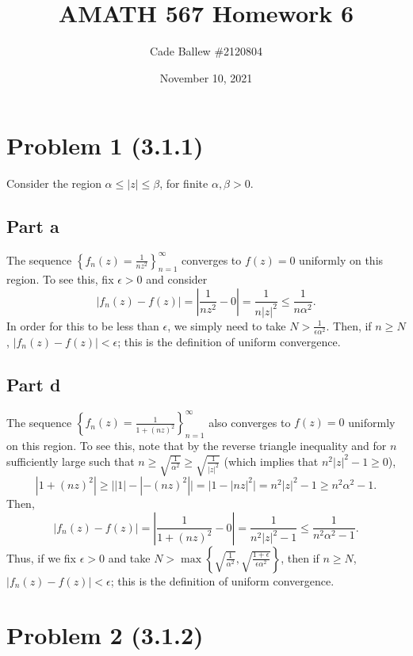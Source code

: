 \documentclass{article}
\title{AMATH 567 Homework 6}
\author{Cade Ballew \#2120804}
\date{November 10, 2021}
\begin{document}
\maketitle

\section{Problem 1 (3.1.1)}
Consider the region $\alpha \leq |z| \leq \beta$, for finite $\alpha, \beta > 0$.
\subsection{Part a}
The sequence $\left\{f_n(z)=\frac{1}{nz^2}\right\}_{n=1}^{\infty}$ converges to $f(z)=0$ uniformly on this region. To see this, fix $\epsilon>0$ and consider 
\[
|f_n(z)-f(z)|=\left|\frac{1}{nz^2}-0\right|=\frac{1}{n|z|^2}\leq\frac{1}{n\alpha^2}.
\]
In order for this to be less than $\epsilon$, we simply need to take $N>\frac{1}{\epsilon\alpha^2}$. Then, if $n\geq N$, $|f_n(z)-f(z)|<\epsilon$; this is the definition of uniform convergence.
\subsection{Part d}
The sequence $\left\{f_n(z)=\frac{1}{1+(nz)^2}\right\}_{n=1}^{\infty}$ also converges to $f(z)=0$ uniformly on this region. To see this, note that by the reverse triangle inequality and for $n$ sufficiently large such that $n\geq\sqrt{\frac{1}{\alpha^2}}\geq\sqrt{\frac{1}{|z|^2}}$ (which implies that $n^2|z|^2-1\geq0$),
\[
|1+(nz)^2|\geq\big||1|-|-(nz)^2|\big|=|1-\big|nz|^2\big|=n^2|z|^2-1\geq n^2\alpha^2-1.
\]
Then,
\[
|f_n(z)-f(z)|=\left|\frac{1}{1+(nz)^2}-0\right|=\frac{1}{n^2|z|^2-1}\leq\frac{1}{n^2\alpha^2-1}.
\]
Thus, if we fix $\epsilon>0$ and take $N>\max\left\{\sqrt{\frac{1}{\alpha^2}},\sqrt{\frac{1+\epsilon}{\epsilon\alpha^2}}\right\}$, then if $n\geq N$, $|f_n(z)-f(z)|<\epsilon$; this is the definition of uniform convergence.

\section{Problem 2 (3.1.2)} 
\end{document}
